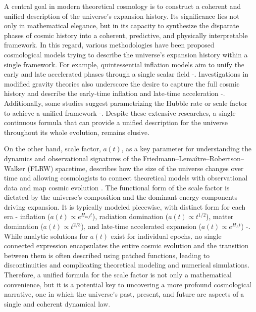 \documentclass[12pt]{article}  %
\begin{document}
A central goal in modern theoretical cosmology is to construct a coherent and unified description of the universe’s expansion history. Its significance lies not only in mathematical elegance, but in its capacity to synthesize the disparate phases of cosmic history into a coherent, predictive, and physically interpretable framework. In this regard, various methodologies have been proposed cosmological models trying to describe the universe's expansion history within a single framework. For example, quintessential inflation models aim to unify the early and late accelerated phases through a single scalar field \cite{1}-\cite{6}. Investigations in modified gravity theories also underscore the desire to capture the full cosmic history and describe the early-time inflation and late-time acceleration \cite{7}-\cite{9}. Additionally, some studies suggest parametrizing the Hubble rate or scale factor to achieve a unified framework \cite{10}-\cite{12}. Despite these extensive researches, a single continuous formula that can provide a unified description for the universe throughout its whole evolution, remains elusive.
\
\


On the other hand, scale factor, $a(t)$, as a key parameter for understanding the dynamics and observational signatures of the Friedmann–Lemaître–Robertson–Walker (FLRW) spacetime, describes how the size of the universe changes over time and allowing cosmologists to connect theoretical models with observational data and map cosmic evolution  \cite {13,14}. The functional form of the scale factor is dictated by the universe's composition and the dominant energy components driving expansion. It is typically modeled piecewise, with distinct form for each era - inflation ($a(t) \propto e^{H_{inf} t}$), radiation domination ($a(t) \propto t^{1/2}$), matter domination ($a(t) \propto  t^{2/3}$), and late-time accelerated expansion ($a(t) \propto e^{H_{ \Lambda} t}$)  \cite{15}-\cite{27}. While analytic solutions for $a(t)$ exist for individual epochs, no single connected expression encapsulates the entire cosmic evolution and the transition between them is often described using patched functions, leading to discontinuities and complicating theoretical modeling and numerical simulations. Therefore, a unified formula for the scale factor is not only a mathematical convenience, but it is a potential key to uncovering a more profound cosmological narrative, one in which the universe’s past, present, and future are aspects of a single and coherent dynamical law.
\end{document}
